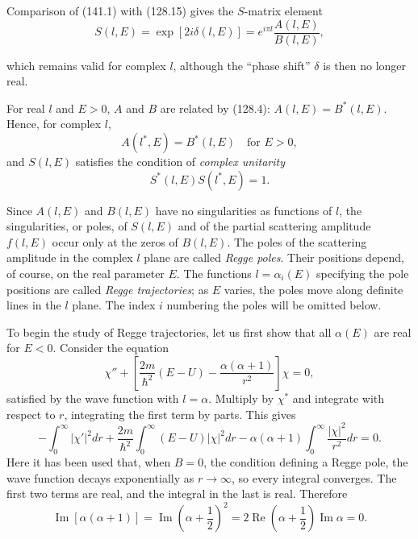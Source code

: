 Comparison of (141.1) with (128.15) gives the $S$-matrix element
\begin{equation}
 S(l,E)=\exp[2i\delta(l,E)]=e^{i\pi l}\frac{A(l,E)}{B(l,E)},
 \tag{141.4}
\end{equation}

which remains valid for complex $l$, although the ``phase shift'' $\delta$ is
then no longer real.

For real $l$ and $E>0$, $A$ and $B$ are related by (128.4):
$A(l,E)=B^*(l,E)$. Hence, for complex $l$,
\begin{equation}
 A(l^*,E)=B^*(l,E)\quad\text{for }E>0,
 \tag{141.5}
\end{equation}
and $S(l,E)$ satisfies the condition of \emph{complex unitarity}
\begin{equation}
 S^*(l,E)S(l^*,E)=1.
 \tag{141.6}
\end{equation}

Since $A(l,E)$ and $B(l,E)$ have no singularities as functions of $l$, the
singularities, or poles, of $S(l,E)$ and of the partial scattering amplitude
$f(l,E)$ occur only at the zeros of $B(l,E)$. The poles of the scattering
amplitude in the complex $l$ plane are called \emph{Regge poles}. Their
positions depend, of course, on the real parameter $E$. The functions
$l=\alpha_i(E)$ specifying the pole positions are called \emph{Regge
trajectories}; as $E$ varies, the poles move along definite lines in the
$l$ plane. The index $i$ numbering the poles will be omitted below.

To begin the study of Regge trajectories, let us first show that all
$\alpha(E)$ are real for $E<0$. Consider the equation
\begin{equation}
 \chi''+\left[\frac{2m}{\hbar^2}(E-U)-\frac{\alpha(\alpha+1)}{r^2}\right]\chi=0,
 \tag{141.7}
\end{equation}
satisfied by the wave function with $l=\alpha$. Multiply by $\chi^*$ and
integrate with respect to $r$, integrating the first term by parts. This gives
\[
 -\int_0^\infty|\chi'|^2dr+\frac{2m}{\hbar^2}\int_0^\infty(E-U)|\chi|^2dr
 -\alpha(\alpha+1)\int_0^\infty\frac{|\chi|^2}{r^2}dr=0.
\]
Here it has been used that, when $B=0$, the condition defining a Regge pole,
the wave function decays exponentially as $r\to\infty$, so every integral
converges. The first two terms are real, and the integral in the last is real.
Therefore
\[
 \operatorname{Im}[\alpha(\alpha+1)]
 =\operatorname{Im}\left(\alpha+\frac12\right)^2
 =2\operatorname{Re}\left(\alpha+\frac12\right)\operatorname{Im}\alpha=0.
\]

